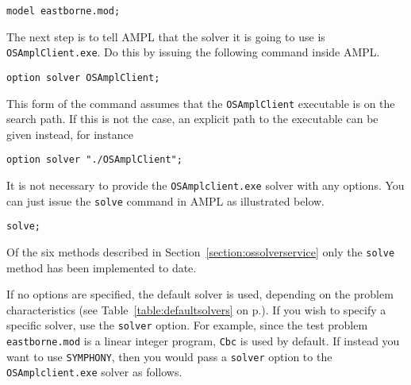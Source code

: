 \begin{verbatim}
model eastborne.mod;
\end{verbatim}

The next step is to tell AMPL that the solver it is going to use is {\tt OSAmplClient.exe}. 
Do this by issuing the following command inside AMPL.

\begin{verbatim}
option solver OSAmplClient;
\end{verbatim}
\ifbible
%
This form of the command assumes that the {\tt OSAmplClient} executable is on the search path. 
If this is not the case, an explicit path to the executable can be given instead, for instance

\begin{verbatim}
option solver "./OSAmplClient";
\end{verbatim}
\fi

It is not necessary to provide the  {\tt OSAmplclient.exe} solver with any options. 
You can just issue the {\tt solve} command in AMPL as illustrated below.  

\begin{verbatim}
solve;
\end{verbatim}

Of the six methods described in Section~\ref{section:ossolverservice} only the {\tt solve} method 
has been implemented to date.

If no options are specified, the default solver is used, depending on the problem characteristics 
(see Table~\ref{table:defaultsolvers} on p.\pageref{table:defaultsolvers}).
If you wish to specify a specific solver, use the {\tt solver} option.   For example,  
since the test problem {\tt eastborne.mod} is a linear integer program, {\tt Cbc} is used by default. 
If instead you want to  use {\tt SYMPHONY},
then you would pass a {\tt solver} option to the {\tt OSAmplclient.exe} solver as follows.%

